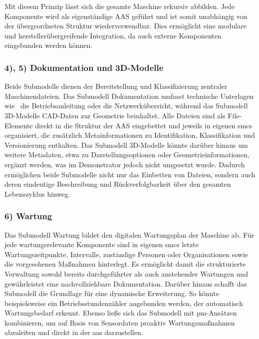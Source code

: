 Mit diesem Prinzip lässt sich die gesamte Maschine rekursiv abbilden. 
Jede Komponente wird als eigenständige AAS geführt und ist somit unabhängig von der übergeordneten Struktur wiederverwendbar. 
Dies ermöglicht eine modulare und herstellerübergreifende Integration, da auch externe Komponenten eingebunden werden können.

\subsubsection*{4), 5) Dokumentation und 3D-Modelle}
\vspace{-0.5em}

Beide Submodelle dienen der Bereitstellung und Klassifizierung zentraler Maschinendateien. 
Das Submodell Dokumentation umfasst technische Unterlagen wie%
\pagebreak
~die Betriebsanleitung oder die Netzwerkübersicht, während das Submodell 3D-Modelle CAD-Daten zur Geometrie beinhaltet. 
Alle Dateien sind als File-Elemente direkt in die Struktur der AAS eingebettet und jeweils in eigenen \acsp{smc} organisiert, die zusätzlich Metainformationen zu Identifikation, Klassifikation und Versionierung enthalten. 
Das Submodell 3D-Modelle könnte darüber hinaus um weitere Metadaten, etwa zu Darstellungsoptionen oder Geometrieinformationen, ergänzt werden, was im Demonstrator jedoch nicht umgesetzt wurde. 
Dadurch ermöglichen beide Submodelle nicht nur das Einbetten von Dateien, sondern auch deren eindeutige Beschreibung und Rückverfolgbarkeit über den gesamten Lebenszyklus hinweg.

\subsubsection*{6) Wartung}
\vspace{-0.5em}

Das Submodell Wartung bildet den digitalen Wartungsplan der Maschine ab. 
Für jede wartungsrelevante Komponente sind in eigenen \acsp{smc} letzte Wartungszeitpunkte, Intervalle, zuständige Personen oder Organisationen sowie die vorgesehenen Maßnahmen hinterlegt. 
Es ermöglicht damit die strukturierte Verwaltung sowohl bereits durchgeführter als auch anstehender Wartungen und gewährleistet eine nachvollziehbare Dokumentation. 
Darüber hinaus schafft das Submodell die Grundlage für eine dynamische Erweiterung. 
So könnte beispielsweise ein Betriebsstundenzähler angebunden werden, der automatisch Wartungsbedarf erkennt. 
Ebenso ließe sich das Submodell mit \acs{pm}-Ansätzen kombinieren, um auf Basis von Sensordaten proaktiv Wartungsmaßnahmen abzuleiten und direkt in der \acs{aas} darzustellen.
